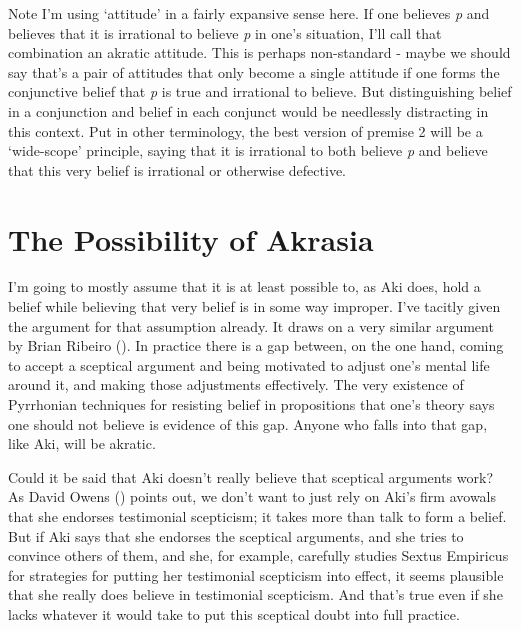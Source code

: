 \documentclass[
  10pt,
  letterpaper,
  twoside]{scrbook}
\begin{document}
Note I'm using `attitude' in a fairly expansive sense here. If one
believes \emph{p} and believes that it is irrational to believe \emph{p}
in one's situation, I'll call that combination an akratic attitude. This
is perhaps non-standard - maybe we should say that's a pair of attitudes
that only become a single attitude if one forms the conjunctive belief
that \emph{p} is true and irrational to believe. But distinguishing
belief in a conjunction and belief in each conjunct would be needlessly
distracting in this context. Put in other terminology, the best version
of premise 2 will be a `wide-scope' principle, saying that it is
irrational to both believe \emph{p} and believe that this very belief is
irrational or otherwise defective.

\section{The Possibility of Akrasia}\label{thepossibilityofakrasia}

I'm going to mostly assume that it is at least possible to, as {Aki}
does, hold a belief while believing that very belief is in some way
improper. I've tacitly given the argument for that assumption already.
It draws on a very similar argument by Brian Ribeiro
(). In practice there is a gap between,
on the one hand, coming to accept a sceptical argument and being
motivated to adjust one's mental life around it, and making those
adjustments effectively. The very existence of Pyrrhonian techniques for
resisting belief in propositions that one's theory says one should not
believe is evidence of this gap. Anyone who falls into that gap, like
{Aki}, will be akratic.

Could it be said that {Aki} doesn't really believe that sceptical
arguments work? As David Owens () points
out, we don't want to just rely on {Aki}'s firm avowals that she
endorses testimonial scepticism; it takes more than talk to form a
belief. But if {Aki} says that she endorses the sceptical arguments, and
she tries to convince others of them, and she, for example, carefully
studies Sextus Empiricus for strategies for putting her testimonial
scepticism into effect, it seems plausible that she really does believe
in testimonial scepticism. And that's true even if she lacks whatever it
would take to put this sceptical doubt into full practice.
\end{document}
